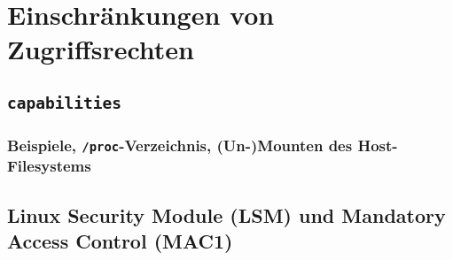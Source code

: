\documentclass[../main.tex]{subfiles}
\begin{document}



  \section{Einschränkungen von Zugriffsrechten}
    \subsection{\texttt{capabilities}}


      \subsubsection{Beispiele, \texttt{/proc}-Verzeichnis, (Un-)Mounten des Host-Filesystems}

    \subsection{Linux Security Module (\acrshort{LSM}) und Mandatory Access Control (\acrshort{MAC1})}

\end{document}
